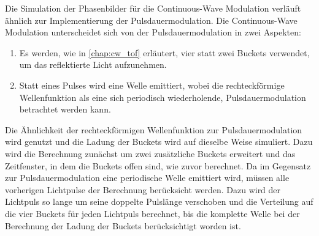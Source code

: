 \documentclass[thesis.tex]{subfiles}
\begin{document}
Die Simulation der Phasenbilder für die Continuous-Wave Modulation verläuft ähnlich zur Implementierung der Pulsdauermodulation. Die Continuous-Wave Modulation unterscheidet sich von der Pulsdauermodulation in zwei Aspekten:

\begin{enumerate}
    \item Es werden, wie in \autoref{chap:cw_tof} erläutert, vier statt zwei Buckets verwendet, um das reflektierte Licht aufzunehmen.
    \item Statt eines Pulses wird eine Welle emittiert, wobei die rechteckförmige Wellenfunktion als eine sich periodisch wiederholende, Pulsdauermodulation betrachtet werden kann.
\end{enumerate}

Die Ähnlichkeit der rechteckförmigen Wellenfunktion zur Pulsdauermodulation wird genutzt und die Ladung der Buckets wird auf dieselbe Weise simuliert. Dazu wird die Berechnung zunächst um zwei zusätzliche Buckets erweitert und das Zeitfenster, in dem die Buckets offen sind, wie zuvor berechnet. Da im Gegensatz zur Pulsdauermodulation eine periodische Welle emittiert wird, müssen alle vorherigen Lichtpulse der Berechnung berücksicht werden. Dazu wird der Lichtpuls so lange um seine doppelte Pulslänge verschoben und die Verteilung auf die vier Buckets für jeden Lichtpuls berechnet, bis die komplette Welle bei der Berechnung der Ladung der Buckets berücksichtigt worden ist.
\end{document}
